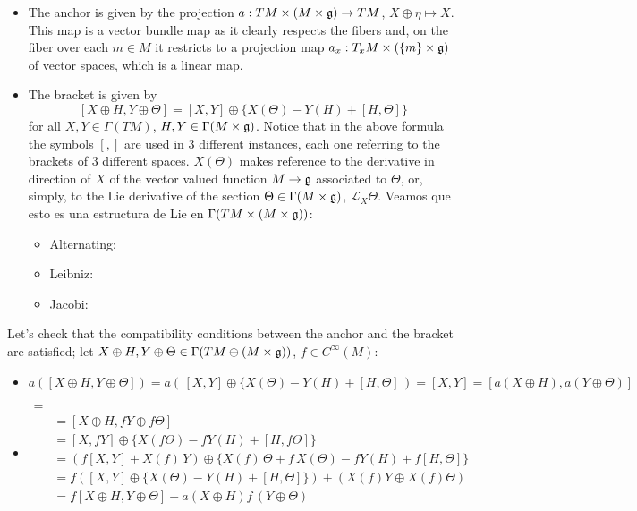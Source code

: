 \begin{itemize}
    \item The anchor is given by the projection $a: TM \times (M \times \mathfrak{g}) \to TM$, $X \oplus \eta \mapsto X$. This map is a vector bundle map as it clearly respects the fibers and, on the fiber over each $m\in M$ it restricts to  a projection map $a_x:T_x M \times (\{m\}\times \mathfrak{g})$ of vector spaces, which is a linear map.
    
    \item The bracket is given by 
    \[
        [X \oplus H, Y \oplus \Theta] = [X, Y] \oplus \{X(\Theta) - Y(H) + [H, \Theta]\}
    \]
    for all $X, Y \in \Gamma(TM)$, $H, Y \in \Gamma(M \times \mathfrak{g})$. Notice that in the above formula the symbols $[,]$ are used in $3$ different instances, each one referring to the brackets of $3$ different spaces. $X(\Theta)$ makes reference to the derivative in direction of $X$ of the vector valued function $M \to \mathfrak{g}$ associated to $\Theta$, or, simply, to the Lie derivative of the section $\Theta \in \Gamma(M \times \mathfrak{g})$, $\mathcal L_X \Theta$. Veamos que esto es una estructura de Lie en $\Gamma(TM \times (M \times \mathfrak{g}))$:
    \begin{itemize}
        \item Alternating:
        \item Leibniz:
        \item Jacobi:
    \end{itemize}
\end{itemize}

Let's check that the compatibility conditions between the anchor and the bracket are satisfied; let $X \oplus H, Y \oplus \Theta \in \Gamma(TM \oplus (M \times \mathfrak{g}))$, $f \in C^\infty(M)$:

\begin{itemize}
    \item $a([X \oplus H, Y \oplus \Theta]) = a(\, [X, Y] \oplus \{X(\Theta) - Y(H) + [H, \Theta] \,) = [X, Y] = [a(X \oplus H), a(Y \oplus \Theta)]$
    
    \item 
    \begin{align*}
        [X \oplus H, &f\cdot (Y \oplus \Theta)] =\\
        &= [X \oplus H, fY \oplus f\Theta] \\
        &=  [X, fY] \oplus \{X(f\Theta) - fY(H) + [H, f\Theta]\} \\
        &= (f[X, Y] + X(f)\,Y) \oplus \{X(f)\,\Theta + f\,X(\Theta) - fY(H) + f[H, \Theta]\} \\
        &=f([X, Y] \oplus \{ X(\Theta) -Y(H) + [H, \Theta]\} ) + (X(f) Y \oplus X(f)\Theta) \\
        &= f[X \oplus H, Y \oplus \Theta] + a(X \oplus H)f \, (Y \oplus \Theta)
    \end{align*}
\end{itemize}

